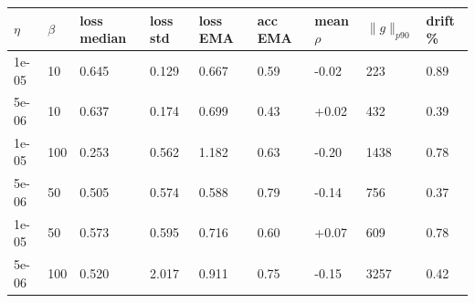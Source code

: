 \begin{tabular}{lllllllll}
\toprule
$\eta$ & $\beta$ & loss median & loss std & loss EMA & acc EMA & mean $\rho$ & $\|g\|_{p90}$ & drift \% \\
\midrule
1e-05 & 10 & 0.645 & 0.129 & 0.667 & 0.59 & -0.02 & 223 & 0.89 \\
5e-06 & 10 & 0.637 & 0.174 & 0.699 & 0.43 & +0.02 & 432 & 0.39 \\
1e-05 & 100 & 0.253 & 0.562 & 1.182 & 0.63 & -0.20 & 1438 & 0.78 \\
5e-06 & 50 & 0.505 & 0.574 & 0.588 & 0.79 & -0.14 & 756 & 0.37 \\
1e-05 & 50 & 0.573 & 0.595 & 0.716 & 0.60 & +0.07 & 609 & 0.78 \\
5e-06 & 100 & 0.520 & 2.017 & 0.911 & 0.75 & -0.15 & 3257 & 0.42 \\
\bottomrule
\end{tabular}
